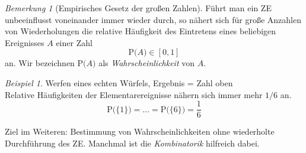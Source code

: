\documentclass[a4paper,12pt,fleqn]{scrartcl}
\newcommand{\prob}[1]{\text{P(} #1 \text{)}}
\newcommand{\unit}{\left[ 0,1\right]}
\theoremstyle{definition}
\theoremstyle{plain}
\theoremstyle{remark}
\newtheorem*{bemerkung}{Bemerkung}
\newtheorem*{beispiel}{Beispiel}
\begin{document}
\begin{bemerkung}[Empirisches Gesetz der großen Zahlen]
Führt man ein ZE unbeeinflusst voneinander immer wieder durch, so nähert sich für große Anzahlen von Wiederholungen die relative Häufigkeit des Eintretens eines beliebigen Ereignisses $A$ einer Zahl
\[\prob{A} \in\unit\]
an. Wir bezeichnen $\prob{A}$ als \emph{Wahrscheinlichkeit} von $A$.
\end{bemerkung}
\begin{beispiel}
Werfen eines echten Würfels, Ergebnis = Zahl oben\\
Relative Häufigkeiten der Elementarereignisse nähern sich immer mehr $1/6$ an.
\[\prob{\{ 1\}}=\ldots=\prob{\{ 6\} }=\frac{1}{6}\]
\end{beispiel}
Ziel im Weiteren: Bestimmung von Wahrscheinlichkeiten ohne wiederholte Durchführung des ZE. Manchmal ist die \emph{Kombinatorik} hilfreich dabei.
\end{document}
